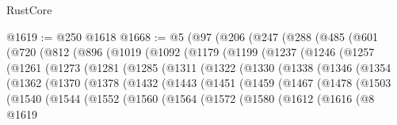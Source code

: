 \begin{lexlean}{RustCore}
\begin{coremodule}
@1619 := @250 @1618
@1668 := @5
    (@97
      (@206
        (@247
          (@288
            (@485
              (@601
                (@720
                  (@812
                    (@896
                      (@1019
                        (@1092
                          (@1179
                            (@1199
                              (@1237
                                (@1246
                                  (@1257
                                    (@1261
                                      (@1273
                                        (@1281
                                          (@1285
                                            (@1311
                                              (@1322
                                                (@1330
                                                  (@1338
                                                    (@1346
                                                      (@1354
                                                        (@1362
                                                          (@1370
                                                            (@1378
                                                              (@1432
                                                                (@1443
                                                                  (@1451
                                                                    (@1459
                                                                      (@1467
                                                                        (@1478
                                                                          (@1503
                                                                            (@1540
                                                                              (@1544
                                                                                (@1552
                                                                                  (@1560
                                                                                    (@1564
                                                                                      (@1572
                                                                                        (@1580
                                                                                          (@1612
                                                                                            (@1616
                                                                                              (@8
                                                                                                @1619

\end{coremodule}
\end{lexlean}
